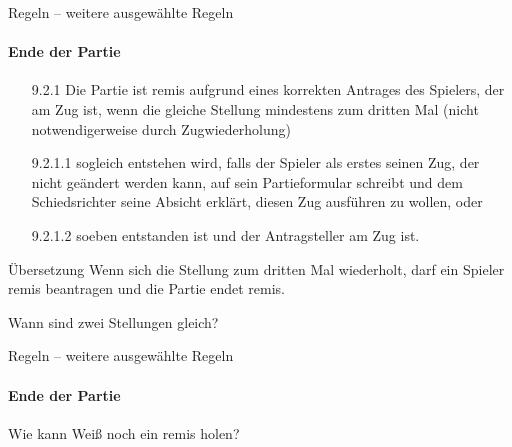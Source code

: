 \documentclass[
  aspectratio=1610,
]{beamer}
\begin{document}
\begin{frame}[<+->]{Regeln – weitere ausgewählte Regeln}
  \framesubtitle{Ende der Partie}
  \begin{itemize}
    \item[9.2.1] Die Partie ist remis aufgrund eines korrekten Antrages des Spielers, der
      am Zug ist, wenn die gleiche Stellung mindestens zum dritten Mal (nicht
      notwendigerweise durch Zugwiederholung)
    \item[9.2.1.1] sogleich entstehen wird, falls der Spieler als erstes seinen Zug, der
      nicht geändert werden kann, auf sein Partieformular schreibt und dem Schiedsrichter
      seine Absicht erklärt, diesen Zug ausführen zu wollen, oder
    \item[9.2.1.2] soeben entstanden ist und der Antragsteller am Zug ist.
  \end{itemize}

  \pause

  \begin{block}{Übersetzung}
    Wenn sich die Stellung zum dritten Mal wiederholt, darf ein Spieler remis
    beantragen und die Partie endet remis.
  \end{block}

  \pause

  Wann sind zwei Stellungen gleich?
\end{frame}

\begin{frame}[<+->]{Regeln – weitere ausgewählte Regeln}
  \framesubtitle{Ende der Partie}
  \begin{center}
    \chessboard[
      setfen=6k/6p/6Q/8/3q/8/rr5P/7K w - - 0 1, %
      moveid=1w,
    ]

    Wie kann Weiß noch ein remis holen?
  \end{center}
\end{frame}
\end{document}
